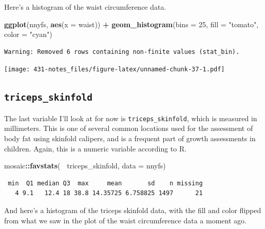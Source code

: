 \documentclass[
]{book}
\newenvironment{Shaded}{\begin{snugshade}}{\end{snugshade}}
\newcommand{\DataTypeTok}[1]{\textcolor[rgb]{0.13,0.29,0.53}{#1}}
\newcommand{\DecValTok}[1]{\textcolor[rgb]{0.00,0.00,0.81}{#1}}
\newcommand{\KeywordTok}[1]{\textcolor[rgb]{0.13,0.29,0.53}{\textbf{#1}}}
\newcommand{\NormalTok}[1]{#1}
\newcommand{\OperatorTok}[1]{\textcolor[rgb]{0.81,0.36,0.00}{\textbf{#1}}}
\newcommand{\StringTok}[1]{\textcolor[rgb]{0.31,0.60,0.02}{#1}}
\begin{document}
Here's a histogram of the waist circumference data.

\begin{Shaded}
\begin{Highlighting}[]
\KeywordTok{ggplot}\NormalTok{(nnyfs, }\KeywordTok{aes}\NormalTok{(}\DataTypeTok{x =}\NormalTok{ waist)) }\OperatorTok{+}
\StringTok{  }\KeywordTok{geom_histogram}\NormalTok{(}\DataTypeTok{bins =} \DecValTok{25}\NormalTok{, }\DataTypeTok{fill =} \StringTok{"tomato"}\NormalTok{, }\DataTypeTok{color =} \StringTok{"cyan"}\NormalTok{)}
\end{Highlighting}
\end{Shaded}

\begin{verbatim}
Warning: Removed 6 rows containing non-finite values (stat_bin).
\end{verbatim}

\texttt{[image: 431-notes\_files/figure-latex/unnamed-chunk-37-1.pdf]}

\hypertarget{triceps_skinfold}{%
\subsection{\texorpdfstring{\texttt{triceps\_skinfold}}{triceps\_skinfold}}\label{triceps_skinfold}}

The last variable I'll look at for now is \texttt{triceps\_skinfold}, which is measured in millimeters. This is one of several common locations used for the assessment of body fat using skinfold calipers, and is a frequent part of growth assessments in children. Again, this is a numeric variable according to R.

\begin{Shaded}
\begin{Highlighting}[]
\NormalTok{mosaic}\OperatorTok{::}\KeywordTok{favstats}\NormalTok{(}\OperatorTok{~}\StringTok{ }\NormalTok{triceps_skinfold, }\DataTypeTok{data =}\NormalTok{ nnyfs)}
\end{Highlighting}
\end{Shaded}

\begin{verbatim}
 min  Q1 median Q3  max     mean       sd    n missing
   4 9.1   12.4 18 38.8 14.35725 6.758825 1497      21
\end{verbatim}

And here's a histogram of the triceps skinfold data, with the fill and color flipped from what we saw in the plot of the waist circumference data a moment ago.
\end{document}
